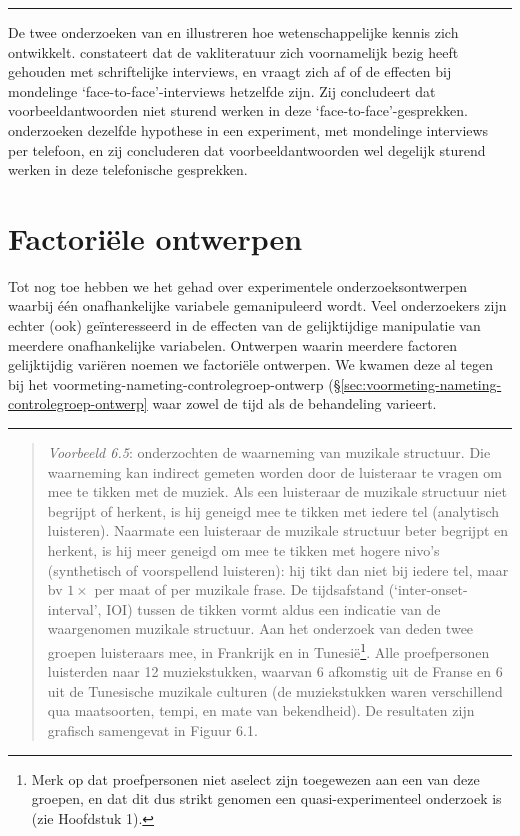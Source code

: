 \documentclass[
]{book}
\begin{document}
\begin{center}\rule{0.5\linewidth}{0.5pt}\end{center}

De twee onderzoeken van \citep{Houtk91} en \citep{Wijff92} illustreren hoe wetenschappelijke kennis zich
ontwikkelt. \citep{Houtk91} constateert dat de vakliteratuur zich voornamelijk bezig
heeft gehouden met schriftelijke interviews, en vraagt zich af of de
effecten bij mondelinge `face-to-face'-interviews hetzelfde zijn. Zij
concludeert dat voorbeeldantwoorden niet sturend werken in deze
`face-to-face'-gesprekken. \citep{Wijff92} onderzoeken dezelfde hypothese in een
experiment, met mondelinge interviews per telefoon, en zij concluderen
dat voorbeeldantwoorden wel degelijk sturend werken in deze telefonische
gesprekken.

\hypertarget{sec:ontwerp-factorieel}{%
\section{Factoriële ontwerpen}\label{sec:ontwerp-factorieel}}

Tot nog toe hebben we het gehad over experimentele onderzoeksontwerpen
waarbij één onafhankelijke variabele gemanipuleerd wordt. Veel
onderzoekers zijn echter (ook) geïnteresseerd in de effecten van de
gelijktijdige manipulatie van meerdere onafhankelijke variabelen.
Ontwerpen waarin meerdere factoren gelijktijdig variëren noemen we
factoriële ontwerpen. We kwamen deze al tegen bij het
voormeting-nameting-controlegroep-ontwerp
(§\ref{sec:voormeting-nameting-controlegroep-ontwerp}
waar zowel de tijd als de behandeling varieert.

\begin{center}\rule{0.5\linewidth}{0.5pt}\end{center}

\begin{quote}
\emph{Voorbeeld 6.5}: \citet{Drake03}
onderzochten de waarneming van muzikale structuur. Die waarneming kan
indirect gemeten worden door de luisteraar te vragen om mee te tikken
met de muziek. Als een luisteraar de muzikale structuur niet begrijpt of
herkent, is hij geneigd mee te tikken met iedere tel (analytisch
luisteren). Naarmate een luisteraar de muzikale structuur beter begrijpt
en herkent, is hij meer geneigd om mee te tikken met hogere nivo's
(synthetisch of voorspellend luisteren): hij tikt dan niet bij iedere
tel, maar bv \(1\times\) per maat of per muzikale frase. De tijdsafstand
(`inter-onset-interval', IOI) tussen de tikken vormt aldus een indicatie
van de waargenomen muzikale structuur. Aan het onderzoek van deden twee
groepen luisteraars mee, in Frankrijk en in Tunesië\footnote{Merk op dat proefpersonen niet aselect zijn toegewezen aan een van deze groepen, en dat dit dus strikt genomen een quasi-experimenteel onderzoek is (zie Hoofdstuk 1).}. Alle
proefpersonen luisterden naar 12 muziekstukken, waarvan 6 afkomstig uit
de Franse en 6 uit de Tunesische muzikale culturen (de muziekstukken
waren verschillend qua maatsoorten, tempi, en mate van bekendheid). De
resultaten zijn grafisch samengevat in Figuur 6.1.
\end{quote}
\end{document}
